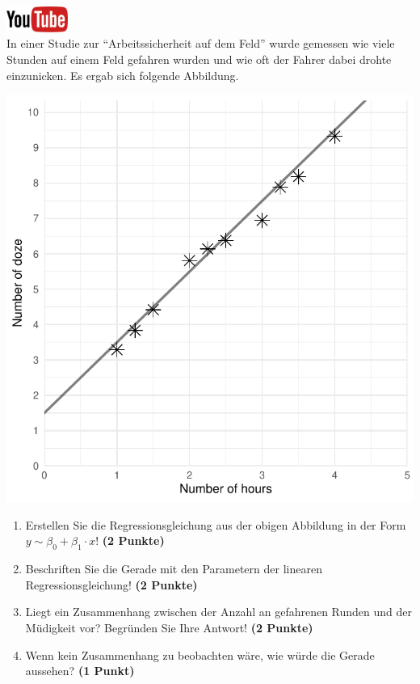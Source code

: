 \documentclass[a4paper, 10pt]{scrartcl}\usepackage[]{graphicx}\usepackage[]{xcolor}
\makeatletter
\def\maxwidth{ %
  \ifdim\Gin@nat@width>\linewidth
    \linewidth
  \else
    \Gin@nat@width
  \fi
}
\makeatother
\begin{document}
\hfill\href{https://youtu.be/2dUJcYK9RgU}{\includegraphics[width =
  2cm]{img/youtube}}\\[1Ex]

In einer Studie zur "`Arbeitssicherheit auf dem Feld"' wurde gemessen wie viele
Stunden auf einem Feld gefahren wurden und wie oft der Fahrer dabei drohte
einzunicken. Es ergab sich folgende Abbildung. 



{\centering \includegraphics[width=\maxwidth]{img/scatter-02-1} 

}




\begin{enumerate}
\item Erstellen Sie die Regressionsgleichung aus der obigen Abbildung in
  der Form $y \sim \beta_0 + \beta_1 \cdot x$! \textbf{(2 Punkte)}
\item Beschriften Sie die Gerade mit den Parametern der linearen
  Regressionsgleichung! \textbf{(2 Punkte)}
\item Liegt ein Zusammenhang zwischen der Anzahl an gefahrenen Runden und
  der M{\"u}digkeit vor? Begr{\"u}nden Sie Ihre Antwort! \textbf{(2 Punkte)}
\item Wenn kein Zusammenhang zu beobachten w{\"a}re, wie w{\"u}rde die Gerade aussehen? \textbf{(1 Punkt)}
\end{enumerate} 
\clearpage
\end{document}
